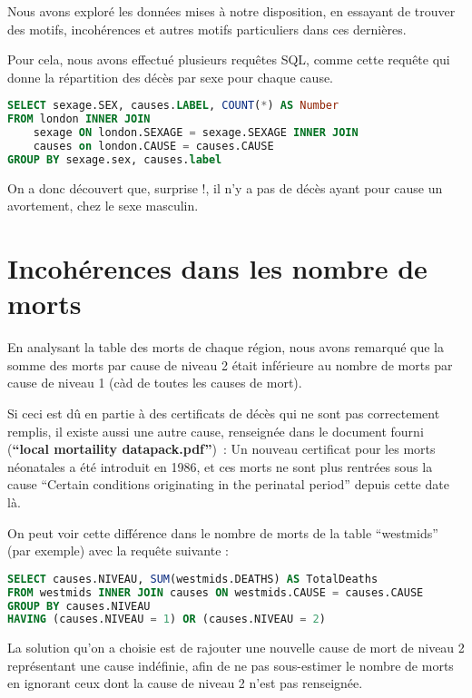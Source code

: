     Nous avons exploré les données mises à notre disposition, en essayant de trouver des motifs, incohérences et autres motifs particuliers
    dans ces dernières.

    Pour cela, nous avons effectué plusieurs requêtes SQL, comme cette requête qui donne la répartition des décès par sexe pour chaque
    cause.

    \begin{lstlisting}[frame=single, language=SQL]
SELECT sexage.SEX, causes.LABEL, COUNT(*) AS Number
FROM london INNER JOIN
    sexage ON london.SEXAGE = sexage.SEXAGE INNER JOIN
    causes on london.CAUSE = causes.CAUSE
GROUP BY sexage.sex, causes.label
    \end{lstlisting}

    On a donc découvert que, surprise !, il n'y a pas de décès ayant pour cause un avortement, chez le sexe masculin.

\section{Incohérences dans les nombre de morts}

    En analysant la table des morts de chaque région, nous avons remarqué que la somme des morts par cause de niveau 2 était
    inférieure au nombre de morts par cause de niveau 1 (càd de toutes les causes de mort).

    Si ceci est dû en partie à des certificats de décès qui ne sont pas correctement remplis, il existe aussi une autre cause,
    renseignée dans le document fourni (\textbf{``local mortaility datapack.pdf''})~: Un nouveau certificat pour les morts néonatales
    a été introduit en 1986, et ces morts ne sont plus rentrées sous la cause ``Certain conditions originating in the perinatal
    period'' depuis cette date là.

    On peut voir cette différence dans le nombre de morts de la table ``westmids'' (par exemple) avec la requête suivante :

    \begin{lstlisting}[frame=single, language=SQL]
SELECT causes.NIVEAU, SUM(westmids.DEATHS) AS TotalDeaths
FROM westmids INNER JOIN causes ON westmids.CAUSE = causes.CAUSE
GROUP BY causes.NIVEAU
HAVING (causes.NIVEAU = 1) OR (causes.NIVEAU = 2)
    \end{lstlisting}

    La solution qu'on a choisie est de rajouter une nouvelle cause de mort de niveau 2 représentant une cause indéfinie, afin
    de ne pas sous-estimer le nombre de morts en ignorant ceux dont la cause de niveau 2 n'est pas renseignée.

